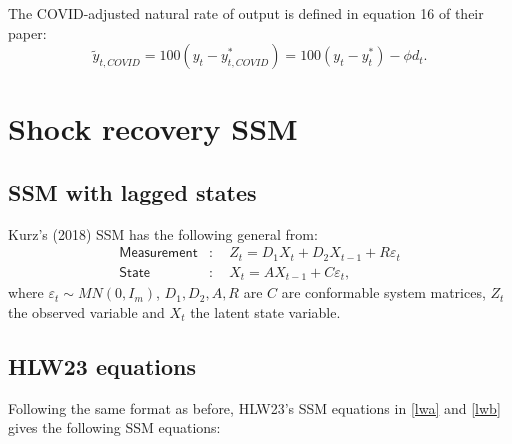 \documentclass[a4paper,12pt]{article}
\newcommand{\bsq}{\begin{subequations}}\newcommand{\esq}{\end{subequations}}
\begin{document}
The COVID-adjusted natural rate of output is defined in equation 16 of their
paper: 
\begin{equation*}
\tilde{y}_{t,COVID}=100(y_{t}-y_{t,COVID}^{\ast })=100\left(
y_{t}-y_{t}^{\ast }\right) -\phi d_{t}.
\end{equation*}

\section{Shock recovery SSM}

\subsection{SSM with lagged states}

Kurz's (2018) SSM has the following general from:\bsq\label{SSM}%
\begin{align}
\mathsf{Measurement}& :\quad Z_{t}=D_{1}X_{t}+D_{2}X_{t-1}+R\varepsilon _{t}
\label{ssm1} \\
\mathsf{State}& :\quad X_{t}=AX_{t-1}+C\varepsilon _{t},  \label{ssm2}
\end{align}%
\esq where $\varepsilon _{t}\sim MN(0,I_{m})$, $D_{1},D_{2},A,R$ are $C$ are
conformable system matrices, $Z_{t}$ the observed variable and $X_{t}$ the
latent state variable.

\subsection{HLW23 equations}

Following the same format as before, HLW23's SSM equations in \ref{lwa} and %
\ref{lwb} gives the following SSM equations:
\end{document}
